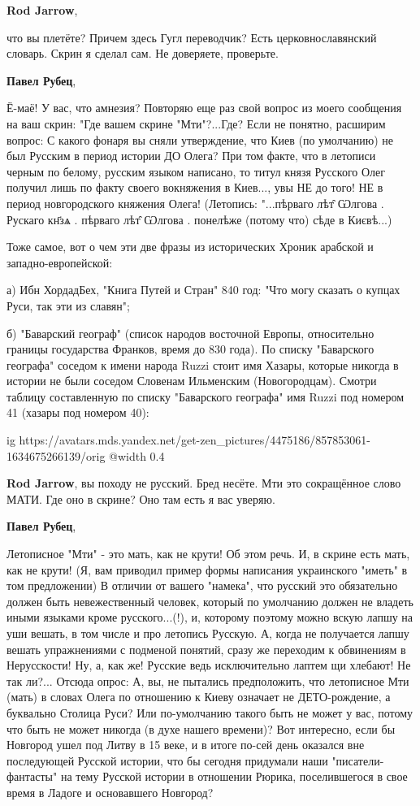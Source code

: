 \begin{itemize}
\begin{itemize}
\textbf{Rod Jarrow}, 

что вы плетёте? Причем здесь Гугл переводчик? Есть церковнославянский
словарь. Скрин я сделал сам. Не доверяете, проверьте.

\textbf{Павел Рубец}, 

Ё-маё! У вас, что амнезия? Повторяю еще раз свой вопрос из моего сообщения на
ваш скрин: "Где вашем скрине "Мти"?...Где? Если не понятно, расширим вопрос: С
какого фонаря вы сняли утверждение, что Киев (по умолчанию) не был Русским в
период истории ДО Олега? При том факте, что в летописи черным по белому,
русским языком написано, то титул князя Русского Олег получил лишь по факту
своего вокняжения в Киев..., увы НЕ до того! НЕ в период новгородского княжения
Олега! (Летопись: "...пѣрваго лѣт̑ Ѡлгова . Рускаго кн҃зѧ . пѣрваго лѣт̑ Ѡлгова .
понелѣже (потому что) сѣде в Києвѣ...)

Тоже самое, вот о чем эти две фразы из исторических Хроник арабской и
западно-европейской:

а) Ибн ХордадБех, "Книга Путей и Стран" 840 год: "Что могу сказать о купцах Руси, так эти из славян";

б) "Баварский географ" (список народов восточной Европы, относительно границы
государства Франков, время до 830 года). По списку "Баварского географа"
соседом к имени народа Ruzzi стоит имя Хазары, которые никогда в истории не
были соседом Словенам Ильменским (Новогородцам). Смотри таблицу составленную
по списку "Баварского географа" имя Ruzzi под номером 41 (хазары под номером
40):

\ifcmt
  ig https://avatars.mds.yandex.net/get-zen_pictures/4475186/857853061-1634675266139/orig
  @width 0.4
\fi

\textbf{Rod Jarrow}, вы походу не русский. Бред несёте. Мти это сокращённое слово МАТИ. Где оно в скрине? Оно там есть я вас уверяю.

\textbf{Павел Рубец}, 

Летописное "Мти" - это мать, как не крути! Об этом речь. И, в скрине есть мать,
как не крути! (Я, вам приводил пример формы написания украинского "иметь" в том
предложении) В отличии от вашего "намека", что русский это обязательно должен
быть невежественный человек, который по умолчанию должен не владеть иными
языками кроме русского...(!), и, которому поэтому можно вскую лапшу на уши
вешать, в том числе и про летопись Русскую. А, когда не получается лапшу вешать
упражнениями с подменой понятий, сразу же переходим к обвинениям в Нерусскости!
Ну, а, как же! Русские ведь исключительно лаптем щи хлебают! Не так ли?...
Отсюда опрос: А, вы, не пытались предположить, что летописное Мти (мать) в
словах Олега по отношению к Киеву означает не ДЕТО-рождение, а буквально
Столица Руси? Или по-умолчанию такого быть не может у вас, потому что быть не
может никогда (в духе нашего времени)? Вот интересно, если бы Новгород ушел под
Литву в 15 веке, и в итоге по-сей день оказался вне последующей Русской
истории, что бы сегодня придумали наши "писатели-фантасты" на тему Русской
истории в отношении Рюрика, поселившегося в свое время в Ладоге и основавшего
Новгород?


\end{itemize}
\end{itemize}
